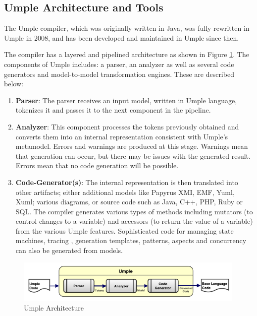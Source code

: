 \subsection{Umple Architecture and Tools}

The Umple compiler, which was originally written in Java, was fully rewritten in Umple in 2008, and has been developed and maintained in Umple since then. 

The compiler has a layered and pipelined architecture as shown in Figure \ref{fig:umpleArchitecture}. 
The components of Umple includes: a parser, an analyzer as well as several code generators and model-to-model transformation engines. These are described below:

\begin{enumerate}
\item \textbf{Parser}: The parser receives an input model, written in Umple language, tokenizes it and passes it to the next component in the pipeline.

\item \textbf{Analyzer}: This component processes the tokens previously obtained and converts them into an internal representation consistent with Umple's metamodel. Errors and warnings are produced at this stage. Warnings mean that generation can occur, but there may be issues with the generated result. Errors mean that no code generation will be possible.

\item \textbf{Code-Generator(s)}: The internal representation is then translated into other artifacts; either additional models like Papyrus XMI, EMF, Yuml, Xuml; various diagrams, or source code such as Java, C++, PHP, Ruby or SQL. The compiler generates various types of methods including mutators (to control changes to a variable) and accessors (to return the value of a variable) from the various Umple features. Sophisticated code for managing state machines, tracing \cite{UmpleTracing}, generation templates, patterns, aspects and concurrency can also be generated from models.

\end{enumerate}
\begin{figure}[h]
\centering
\includegraphics[width=0.99\textwidth]{Figures/umpleArchitecture.pdf} 
\caption{Umple Architecture}
\label{fig:umpleArchitecture}
\end{figure}

